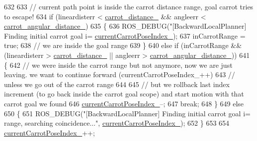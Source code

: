 \begin{DoxyCode}
{632 
633                 \textcolor{comment}{// current path point is inside the carrot distance range, goal carrot tries to escape!}
634                 \textcolor{keywordflow}{if} (lineardisterr < \hyperlink{classcl__move__base__z_1_1backward__local__planner_1_1BackwardLocalPlanner_a0bbb80ce5bae865c4322869422803296}{carrot\_distance\_} && angleerr < 
      \hyperlink{classcl__move__base__z_1_1backward__local__planner_1_1BackwardLocalPlanner_a63e30befa09c4a67cf55086923b760c7}{carrot\_angular\_distance\_})
635                 \{
636                     ROS\_DEBUG(\textcolor{stringliteral}{"[BackwardLocalPlanner] Finding initial carrot goal i=%
      \hyperlink{classcl__move__base__z_1_1backward__local__planner_1_1BackwardLocalPlanner_a2e8f2b78bc97f27c5fa431f3af2261ed}{currentCarrotPoseIndex\_});
637                     inCarrotRange = \textcolor{keyword}{true};
638                     \textcolor{comment}{// we are inside the goal range}
639                 \}
640                 \textcolor{keywordflow}{else} \textcolor{keywordflow}{if} (inCarrotRange && (lineardisterr > \hyperlink{classcl__move__base__z_1_1backward__local__planner_1_1BackwardLocalPlanner_a0bbb80ce5bae865c4322869422803296}{carrot\_distance\_} || angleerr > 
      \hyperlink{classcl__move__base__z_1_1backward__local__planner_1_1BackwardLocalPlanner_a63e30befa09c4a67cf55086923b760c7}{carrot\_angular\_distance\_}))
641                 \{
642                     \textcolor{comment}{// we were inside the carrot range but not anymore, now we are just leaving. we want to
       continue forward (currentCarrotPoseIndex\_++)}
643                     \textcolor{comment}{// unless we go out of the carrot range}
644 
645                     \textcolor{comment}{// but we rollback last index increment (to go back inside the carrot goal scope) and
       start motion with that carrot goal we found}
646                     \hyperlink{classcl__move__base__z_1_1backward__local__planner_1_1BackwardLocalPlanner_a2e8f2b78bc97f27c5fa431f3af2261ed}{currentCarrotPoseIndex\_}--;
647                     \textcolor{keywordflow}{break};
648                 \}
649                 \textcolor{keywordflow}{else}
650                 \{
651                     ROS\_DEBUG(\textcolor{stringliteral}{"[BackwardLocalPlanner] Finding initial carrot goal i=%
       range, searching coincidence..."}, \hyperlink{classcl__move__base__z_1_1backward__local__planner_1_1BackwardLocalPlanner_a2e8f2b78bc97f27c5fa431f3af2261ed}{currentCarrotPoseIndex\_});
652                 \}
653 
654                 \hyperlink{classcl__move__base__z_1_1backward__local__planner_1_1BackwardLocalPlanner_a2e8f2b78bc97f27c5fa431f3af2261ed}{currentCarrotPoseIndex\_}++;
}}
\end{DoxyCode}
